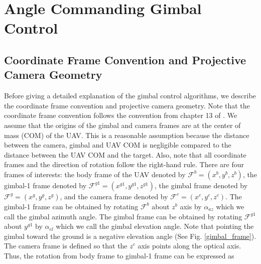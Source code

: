 \section{Angle Commanding Gimbal Control}
\subsection{Coordinate Frame Convention and Projective Camera Geometry}
Before giving a detailed explanation of the gimbal control algorithms, we describe the coordinate frame convention and projective camera geometry. Note that the coordinate frame convention follows the convention from chapter 13 of \cite{beard2012small}. We assume that the origins of the gimbal and camera frames are at the center of mass (COM) of the UAV. This is a reasonable assumption because the distance between the camera, gimbal and UAV COM is negligible compared to the distance between the UAV COM and the target. Also, note that all coordinate frames and the direction of rotation follow the right-hand rule. There are four frames of interests: the body frame of the UAV denoted by $\mathcal{F}^b=(x^{b}, y^{b}, z^{b})$, the gimbal-1 frame denoted by $\mathcal{F}^{g1}=(x^{g1}, y^{g1}, z^{g1})$, the gimbal frame denoted by $\mathcal{F}^{g}=(x^{g}, y^{g}, z^{g})$, and the camera frame denoted by $\mathcal{F}^{c}=(x^{c}, y^{c}, z^{c})$. The gimbal-1 frame can be obtained by rotating $\mathcal{F}^b$ about $z^{b}$ axis by $\alpha_{az}$ which we call the gimbal azimuth angle. The gimbal frame can be obtained by rotating $\mathcal{F}^{g1}$ about $y^{g1}$ by $\alpha_{el}$ which we call the gimbal elevation angle. Note that pointing the gimbal toward the ground is a negative elevation angle (See Fig. \ref{gimbal_frame}). The camera frame is defined so that the $z^{c}$ axis points along the optical axis. Thus, the rotation from body frame to gimbal-1 frame can be expressed as

